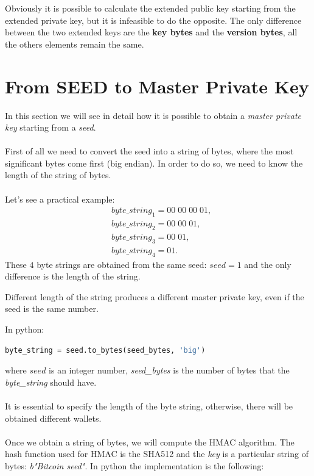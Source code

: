 \begin{remark}
	Obviously it is possible to calculate the extended public key starting from the extended private key, but it is infeasible to do the opposite. The only difference between the two extended keys are the \textbf{key bytes} and the \textbf{version bytes}, all the others elements remain the same.
\end{remark}

\section{From SEED to Master Private Key}
In this section we will see in detail how it is possible to obtain a \textit{master private key} starting from a \textit{seed}.
\\ \\
First of all we need to convert the seed into a string of bytes, where the most significant bytes come first (big endian). In order to do so, we need to know the length of the string of bytes. \\ \\
Let's see a practical example:
\begin{equation*}
\begin{split}
&byte\_string_1=00\; 00\; 00 \; 01, \\
&byte\_string_2=00\; 00\; 01, \\
&byte\_string_3=00\; 01, \\
&byte\_string_4=01.
\end{split}
\end{equation*}
These $4$ byte strings are obtained from the same seed: $seed=1$ and the only difference is the length of the string.
\begin{remark}
	Different length of the string produces a different master private key, even if the seed is the same number.
\end{remark}
In python:
\begin{lstlisting}[language=Python]
byte_string = seed.to_bytes(seed_bytes, 'big')
\end{lstlisting}
where $seed$ is an integer number, \textit{seed\_bytes} is the number of bytes that the \textit{byte\_string} should have. 
\\ \\
It is essential to specify the length of the byte string, otherwise, there will be obtained different wallets. 
\\ \\
Once we obtain a string of bytes, we will compute the HMAC algorithm. The hash function used for HMAC is the SHA512 and the \textit{key} is a particular string of bytes: \textit{b"Bitcoin seed"}. In python the implementation is the following:

